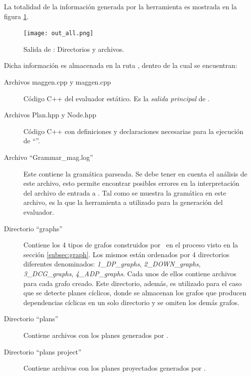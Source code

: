\begin{center}
{\scriptsize{}}\end{center}

La totalidad de la información generada por la herramienta es mostrada en la figura \ref{fig:outmaggen}.

\begin{figure}[!ht]\centering
\texttt{[image: out\_all.png]}
\caption{\label{fig:outmaggen} Salida de \maggen: Directorios y archivos.}
\end{figure}

Dicha información es almacenada en la ruta , dentro de la cual se encuentran:

\begin{description}
\item [Archivos maggen.cpp y maggen.cpp] Código C++ del evaluador estático. Es la \emph{salida principal} de \maggen.

\item [Archivos Plan.hpp y Node.hpp] Código C++ con definiciones y declaraciones necesarias para la ejecución de ``\maggen''.

\item [Archivo ``Grammar\_mag.log''] Este contiene la gramática parseada. Se debe tener en cuenta el análisis de este archivo, esto permite encontrar posibles errores en la interpretación del archivo de entrada a \maggen. Tal como se muestra la gramática en este archivo, es la que la herramienta a utilizado para la generación del evaluador.

\item [Directorio ``graphs''] Contiene los 4 tipos de grafos construidos por \maggen\ en el proceso visto en la sección \ref{subsec:graph}. Los mismos están ordenados por 4 directorios diferentes denominados: \textit{1\_DP\_graphs}, \textit{2\_DOWN\_graphs}, \textit{3\_DCG\_graphs}, \textit{4\_ADP\_graphs}. Cada unos de ellos contiene archivos  para cada grafo creado. Este directorio, además, es utilizado para el caso que se detecte planes cíclicos, donde se almacenan los grafos que producen dependencias cíclicas en un solo directorio y se omiten los demás grafos.

\item [Directorio ``plans''] Contiene archivos  con los planes generados por \maggen.

\item [Directorio ``plans project''] Contiene archivos  con los planes proyectados generados por \maggen.
\end{description}

